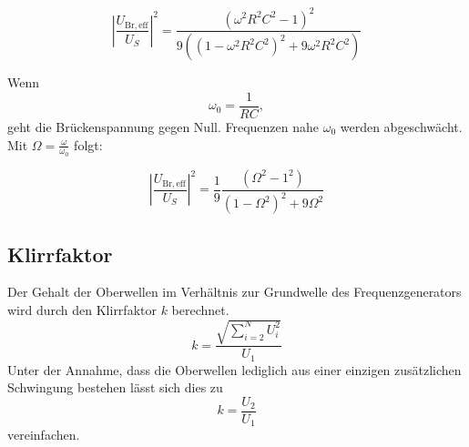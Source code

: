\begin{equation}
\left\lvert\frac{U_\mathrm{Br,eff}}{U_S}\right\rvert^2 = \frac{(\omega^2 R^2 C^2 -1)^2}{9((1 - \omega^2 R^2 C^2)^2 + 9\omega^2 R^2 C^2)}
\end{equation}

Wenn
\begin{equation}
  \label{eqn:resonanz}
  \omega_0 = \frac{1}{RC},
\end{equation} geht die Brückenspannung gegen Null. Frequenzen nahe $\omega_0$ werden abgeschwächt.
Mit $\Omega = \frac{\omega}{\omega_0}$ folgt:

\begin{equation}
  \label{eqn:wr}
  \left\lvert \frac{U_\mathrm{Br,eff}}{U_S} \right\rvert^2 = \frac{1}{9} \frac {(\Omega^2 -1^2)}{(1 - \Omega^2)^2 + 9 \Omega^2}
\end{equation}

\subsection{Klirrfaktor}
Der Gehalt der Oberwellen im Verhältnis zur Grundwelle des Frequenzgenerators wird durch den Klirrfaktor $k$ berechnet.
\begin{equation}
  \label{eqn:klirr1}
  k = \frac{\sqrt{\sum_{i=2}^N U_i^2}}{U_{1}}
\end{equation}
Unter der Annahme, dass die Oberwellen lediglich aus einer einzigen zusätzlichen Schwingung bestehen lässt sich dies zu
\begin{equation}
  \label{eqn:klirr2}
  k = \frac{U_2}{U_1}
\end{equation}
vereinfachen.
